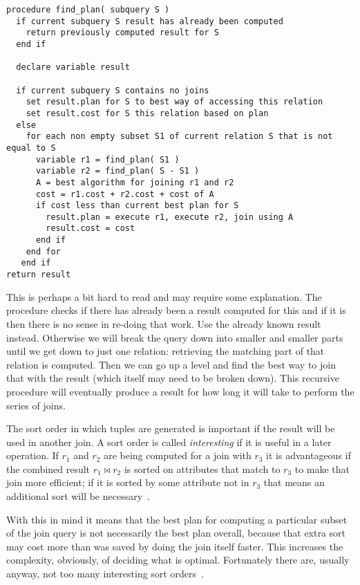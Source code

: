 \documentclass[a4paper]{report}
\begin{document}
\begin{verbatim}
procedure find_plan( subquery S ) 
  if current subquery S result has already been computed
    return previously computed result for S
  end if

  declare variable result

  if current subquery S contains no joins
    set result.plan for S to best way of accessing this relation
    set result.cost for S this relation based on plan
  else 
    for each non empty subset S1 of current relation S that is not equal to S
      variable r1 = find_plan( S1 ) 
      variable r2 = find_plan( S - S1 )
      A = best algorithm for joining r1 and r2
      cost = r1.cost + r2.cost + cost of A
      if cost less than current best plan for S
        result.plan = execute r1, execute r2, join using A
        result.cost = cost
      end if  
    end for
   end if
return result
\end{verbatim}

This is perhaps a bit hard to read and may require some explanation. The procedure checks if there has already been a result computed for this and if it is then there is no sense in re-doing that work. Use the already known result instead. Otherwise we will break the query down into smaller and smaller parts until we get down to just one relation: retrieving the matching part of that relation is computed. Then we can go up a level and find the best way to join that with the result (which itself may need to be broken down). This recursive procedure will eventually produce a result for how long it will take to perform the series of joins.

The sort order in which tuples are generated is important if the result will be used in another join. A sort order is called \textit{interesting} if it is useful in a later operation. If $r_{1}$ and $r_{2}$ are being computed for a join with $r_{3}$ it is advantageous if the combined result $r_{1} \bowtie r_{2}$ is sorted on attributes that match to $r_{3}$ to make that join more efficient; if it is sorted by some attribute not in $r_{3}$ that means an additional sort will be necessary~\cite{dsc}.

With this in mind it means that the best plan for computing a particular subset of the join query is not necessarily the best plan overall, because that extra sort may cost more than was saved by doing the join itself faster. This increases the complexity, obviously, of deciding what is optimal. Fortunately there are, usually anyway, not too many interesting sort orders~\cite{dsc}. 
\end{document}
